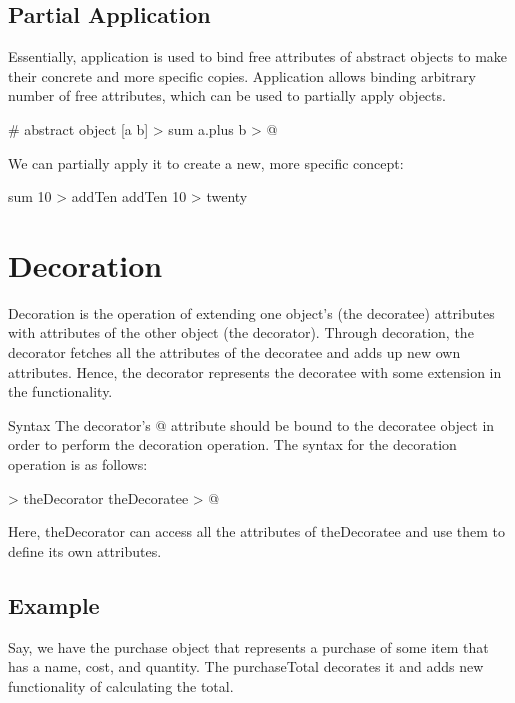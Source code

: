 \documentclass[12pt]{book}
\begin{document}
\subsection{Partial Application}
\noindent{}

Essentially, application is used to bind free attributes of abstract objects to make their concrete and more specific copies. Application allows binding arbitrary number of free attributes, which can be used to partially apply objects.

\begin{ffcode}
# abstract object
[a b] > sum
  a.plus b > @
\end{ffcode}

We can partially apply it to create a new, more specific concept:
\begin{ffcode}
sum 10 > addTen
addTen 10 > twenty
\end{ffcode}

\section{Decoration}
Decoration is the operation of extending one object's (the decoratee) attributes with attributes of the other object (the decorator). Through decoration, the decorator fetches all the attributes of the decoratee and adds up new own attributes. Hence, the decorator represents the decoratee with some extension in the functionality.

Syntax
The decorator's @ attribute should be bound to the decoratee object in order to perform the decoration operation.
The syntax for the decoration operation is as follows:

\begin{ffcode}
[] > theDecorator
  theDecoratee > @
\end{ffcode}
Here, theDecorator can access all the attributes of theDecoratee and use them to define its own attributes.

\subsection{Example}
Say, we have the purchase object that represents a purchase of some item that has a name, cost, and quantity. The purchaseTotal decorates it and adds new functionality of calculating the total.
\end{document}
